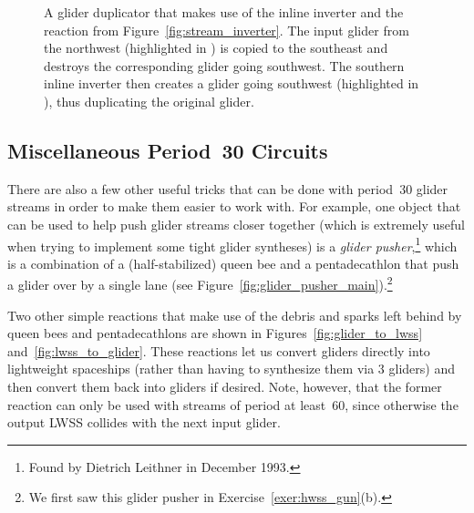 \begin{figure}[!htb]
	\centering
	\caption{A glider duplicator that makes use of the inline inverter and the reaction from Figure~\ref{fig:stream_inverter}. The input glider from the northwest (highlighted in ) is copied to the southeast and destroys the corresponding glider going southwest. The southern inline inverter then creates a glider going southwest (highlighted in ), thus duplicating the original glider.}\label{fig:glider_duplicator}
\end{figure}



\subsection{Miscellaneous Period~30 Circuits}\label{sec:p30_misc_circuits}

There are also a few other useful tricks that can be done with period~$30$ glider streams in order to make them easier to work with. For example, one object that can be used to help push glider streams closer together (which is extremely useful when trying to implement some tight glider syntheses) is a \emph{glider pusher},\footnote{Found by Dietrich Leithner in December 1993.} which is a combination of a (half-stabilized) queen bee and a pentadecathlon that push a glider over by a single lane (see Figure~\ref{fig:glider_pusher_main}).\footnote{We first saw this glider pusher in Exercise~\ref{exer:hwss_gun}(b).}

Two other simple reactions that make use of the debris and sparks left behind by queen bees and pentadecathlons are shown in Figures~\ref{fig:glider_to_lwss} and~\ref{fig:lwss_to_glider}. These reactions let us convert gliders directly into lightweight spaceships (rather than having to synthesize them via $3$ gliders) and then convert them back into gliders if desired. Note, however, that the former reaction can only be used with streams of period at least~$60$, since otherwise the output LWSS collides with the next input glider.

